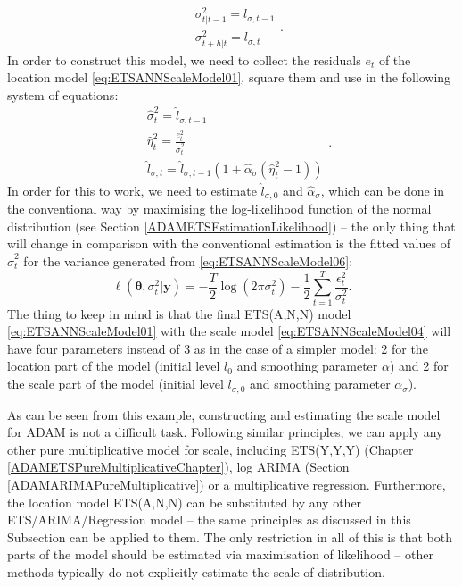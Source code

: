 \documentclass[
]{book}
\theoremstyle{definition}
\theoremstyle{definition}
\theoremstyle{definition}
\theoremstyle{definition}
\theoremstyle{remark}
\begin{document}
\begin{equation}
  \begin{aligned}
    &\sigma_{t|t-1}^2 = l_{\sigma,t-1} \\
    &\sigma_{t+h|t}^2 = l_{\sigma,t} 
  \end{aligned}.
  \label{eq:ETSANNScaleModel05}
\end{equation}
In order to construct this model, we need to collect the residuals \(e_t\) of the location model \eqref{eq:ETSANNScaleModel01}, square them and use in the following system of equations:
\begin{equation}
  \begin{aligned}
    &\hat{\sigma}^2_{t} = \hat{l}_{\sigma,t-1} \\
    &\hat{\eta}_t^2 = \frac{e_t^2}{\hat{\sigma}^2_{t}} \\
    &\hat{l}_{\sigma,t} = \hat{l}_{\sigma,t-1} (1 + \hat{\alpha}_\sigma (\hat{\eta}_t^2-1))
  \end{aligned}.
  \label{eq:ETSANNScaleModel06}
\end{equation}
In order for this to work, we need to estimate \(\hat{l}_{\sigma,0}\) and \(\hat{\alpha}_\sigma\), which can be done in the conventional way by maximising the log-likelihood function of the normal distribution (see Section \ref{ADAMETSEstimationLikelihood}) -- the only thing that will change in comparison with the conventional estimation is the fitted values of \(\hat{\sigma}^2_{t}\) for the variance generated from \eqref{eq:ETSANNScaleModel06}:
\begin{equation}
    \ell(\boldsymbol{\theta}, {\sigma}_t^2 | \mathbf{y}) = -\frac{T}{2} \log(2 \pi \sigma_t^2) -\frac{1}{2} \sum_{t=1}^T \frac{\epsilon_t^2}{\sigma_t^2} .
  \label{eq:ETSANNScaleModelLogLik}
\end{equation}
The thing to keep in mind is that the final ETS(A,N,N) model \eqref{eq:ETSANNScaleModel01} with the scale model \eqref{eq:ETSANNScaleModel04} will have four parameters instead of 3 as in the case of a simpler model: 2 for the location part of the model (initial level \(l_{0}\) and smoothing parameter \(\alpha\)) and 2 for the scale part of the model (initial level \(l_{\sigma,0}\) and smoothing parameter \(\alpha_\sigma\)).

As can be seen from this example, constructing and estimating the scale model for ADAM is not a difficult task. Following similar principles, we can apply any other pure multiplicative model for scale, including ETS(Y,Y,Y) (Chapter \ref{ADAMETSPureMultiplicativeChapter}), log ARIMA (Section \ref{ADAMARIMAPureMultiplicative}) or a multiplicative regression. Furthermore, the location model ETS(A,N,N) can be substituted by any other ETS/ARIMA/Regression model -- the same principles as discussed in this Subsection can be applied to them. The only restriction in all of this is that both parts of the model should be estimated via maximisation of likelihood -- other methods typically do not explicitly estimate the scale of distribution.
\end{document}
